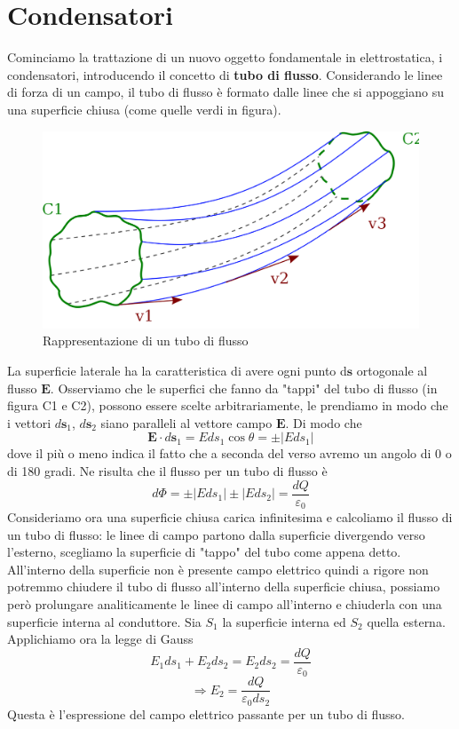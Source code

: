 \documentclass[
10pt, %
a4paper, %
oneside, %
headinclude,footinclude, %
BCOR5mm, %
]{scrartcl}
\begin{document}
\section{Condensatori}
Cominciamo la trattazione di un nuovo oggetto fondamentale in elettrostatica, i condensatori, introducendo il concetto di \textbf{tubo di flusso}. Considerando le linee di forza di un campo, il tubo di flusso è formato dalle linee che si appoggiano su una superficie chiusa (come quelle verdi in figura).
\begin{figure}[h!]
	\centering
	\includegraphics[width=0.6\linewidth]{../images/tubo_di_flusso}
	\caption{Rappresentazione di un tubo di flusso}
	\label{fig:tubodiflusso}
\end{figure}
\FloatBarrier
La superficie laterale ha la caratteristica di avere ogni punto d$\mathbf{s}$ ortogonale al flusso $\mathbf{E}$. Osserviamo che le superfici che fanno da "tappi" del tubo di flusso (in figura C1 e C2), possono essere scelte arbitrariamente, le prendiamo in modo che i vettori $d\mathbf{s}_1$, \(d\mathbf{s}_2\) siano paralleli al vettore campo $\mathbf{E}$. Di modo che
\[\mathbf{E}\cdot d\mathbf{s}_1 = Eds_1\cos\theta= \pm |Eds_1|\]
dove il più o meno indica il fatto che a seconda del verso avremo un angolo di 0 o di 180 gradi. Ne risulta che il flusso per un tubo di flusso è
\[d\Phi = \pm |Eds_1|\pm |Eds_2| =\frac{dQ}{\varepsilon_0}\]
Consideriamo ora una superficie chiusa carica infinitesima e calcoliamo il flusso di un tubo di flusso: le linee di campo partono dalla superficie divergendo verso l'esterno, scegliamo la superficie di "tappo" del tubo come appena detto. All'interno della superficie non è presente campo elettrico quindi a rigore non potremmo chiudere il tubo di flusso all'interno della superficie chiusa, possiamo però prolungare analiticamente le linee di campo all'interno e chiuderla con una superficie interna al conduttore. Sia \(S_1\) la superficie interna ed \(S_2\) quella esterna. Applichiamo ora la legge di Gauss
\[E_1ds_1+E_2ds_2 = E_2ds_2 = \frac{dQ}{\varepsilon_0}\]
\[\Rightarrow E_2 = \frac{dQ}{\varepsilon_0 ds_2}\]
Questa è l'espressione del campo elettrico passante per un tubo di flusso.\\
\end{document}
